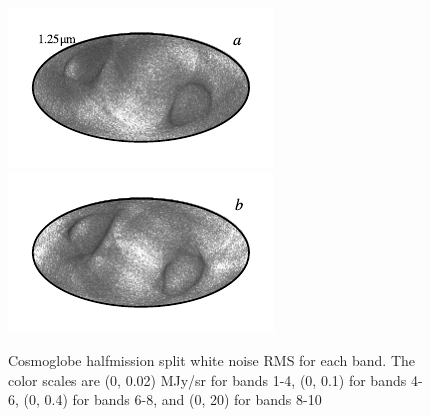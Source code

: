 \documentclass{aa}
\begin{document}
\begin{figure}
	\includegraphics{figs/rms_maps/rms_01a_c0001_000019.pdf}\includegraphics{figs/rms_maps/rms_01b_c0001_000019.pdf}
  \vspace*{-0.85cm}

	\caption{Cosmoglobe halfmission split white noise RMS for each band. The color scales are (0, 0.02) MJy/sr for bands 1-4, (0, 0.1) for bands 4-6, (0, 0.4) for bands 6-8, and (0, 20) for bands 8-10}
	\label{fig:rms}
\end{figure}
\end{document}
